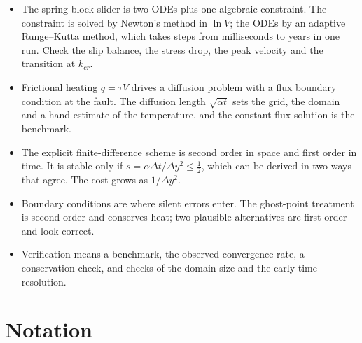 \begin{itemize}[itemsep=2pt,topsep=2pt]
\item The spring-block slider is two ODEs plus one algebraic constraint. The constraint is solved by Newton's method in $\ln V$; the ODEs by an adaptive Runge--Kutta method, which takes steps from milliseconds to years in one run. Check the slip balance, the stress drop, the peak velocity and the transition at $k_{cr}$.
\item Frictional heating $q=\tau V$ drives a diffusion problem with a flux boundary condition at the fault. The diffusion length $\sqrt{\alpha t}$ sets the grid, the domain and a hand estimate of the temperature, and the constant-flux solution is the benchmark.
\item The explicit finite-difference scheme is second order in space and first order in time. It is stable only if $s=\alpha\Delta t/\Delta y^2\le\tfrac12$, which can be derived in two ways that agree. The cost grows as $1/\Delta y^2$.
\item Boundary conditions are where silent errors enter. The ghost-point treatment is second order and conserves heat; two plausible alternatives are first order and look correct.
\item Verification means a benchmark, the observed convergence rate, a conservation check, and checks of the domain size and the early-time resolution.
\end{itemize}

\section{Notation}
\label{sec:l3-notation}

